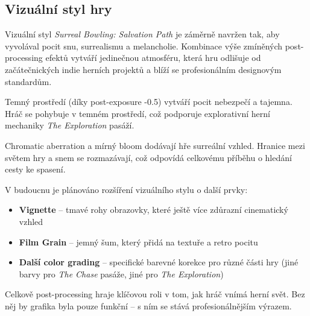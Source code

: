 \subsection{Vizuální styl hry}
\label{sec:vizualni-styl-hry}

Vizuální styl \emph{Surreal Bowling: Salvation Path} je záměrně navržen tak, aby vyvolával pocit snu, surrealismu a melancholie. Kombinace výše zmíněných post-processing efektů vytváří jedinečnou atmosféru, která hru odlišuje od začátečnických indie herních projektů a blíží se profesionálním designovým standardům.

Temný prostředí (díky post-exposure -0.5) vytváří pocit nebezpečí a tajemna. Hráč se pohybuje v temném prostředí, což podporuje explorativní herní mechaniky \emph{The Exploration} pasáží.

Chromatic aberration a mírný bloom dodávají hře surreální vzhled. Hranice mezi světem hry a snem se rozmazávají, což odpovídá celkovému příběhu o hledání cesty ke spasení.

V budoucnu je plánováno rozšíření vizuálního stylu o další prvky:
\begin{itemize}
    \item \textbf{Vignette} -- tmavé rohy obrazovky, které ještě více zdůrazní cinematický vzhled
    \item \textbf{Film Grain} -- jemný šum, který přidá na textuře a retro pocitu
    \item \textbf{Další color grading} -- specifické barevné korekce pro různé části hry (jiné barvy pro \emph{The Chase} pasáže, jiné pro \emph{The Exploration})
\end{itemize}

Celkově post-processing hraje klíčovou roli v tom, jak hráč vnímá herní svět. Bez něj by grafika byla pouze funkční -- s ním se stává profesionálnějším výrazem.